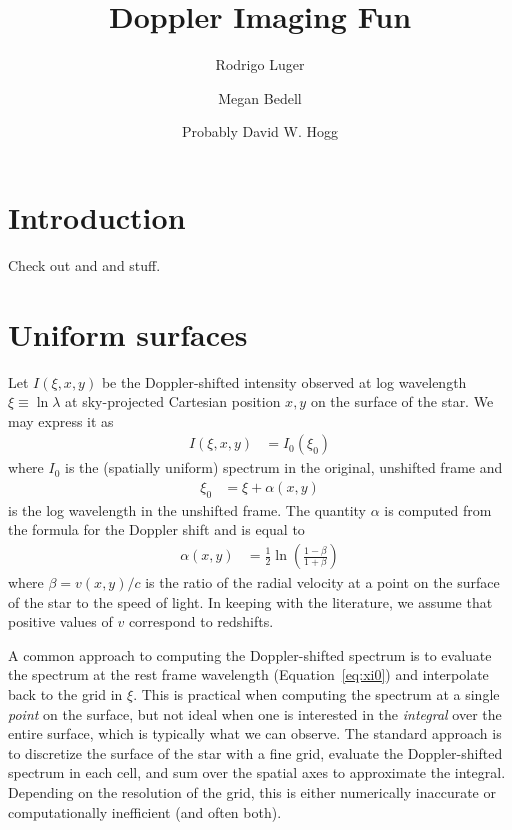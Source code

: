 \documentclass[modern]{aastex62}
\begin{document}
\title{Doppler Imaging Fun}

\author[0000-0002-0296-3826]{Rodrigo Luger}
%
\author{Megan Bedell}
%
\author{Probably David W. Hogg}

%
\section{Introduction}
%
Check out \citet{Luger2019} and \citet{Bedell2019} and stuff.

%
\section{Uniform surfaces}
\label{sec:uniform surfaces}
%
Let $I(\xi, x, y)$ be the Doppler-shifted intensity observed at log wavelength 
$\xi \equiv \ln\lambda$ at sky-projected Cartesian position $x, y$ on the 
surface of the star. We may express it as
%
\begin{align}
    \label{eq:IntensityUnif}
    I(\xi, x, y) &= I_0(\xi_0)
\end{align}
%
where $I_0$ is the (spatially uniform) spectrum in the original, unshifted 
frame and 
%
\begin{align}
    \label{eq:xi0}
    \xi_0 &= \xi + \alpha(x, y)
\end{align}
%
is the log wavelength in the unshifted frame. The quantity $\alpha$ is
computed from the formula for the Doppler shift and is equal to
%
\begin{align}
    \alpha(x, y) 
        &=
        \frac{1}{2}\ln\left( 
            \frac{1 - \beta}{1 + \beta} 
        \right) 
\end{align}
%
where $\beta = v(x, y) / c$ is the ratio of the 
radial velocity at a point on 
the surface of the star to the speed of light. In keeping with the 
literature, we assume that positive values of $v$ correspond to redshifts.

A common approach to computing the Doppler-shifted spectrum is to
evaluate the spectrum at the rest frame wavelength (Equation~\ref{eq:xi0})
and interpolate back to the grid in $\xi$. This is practical when
computing the spectrum at a single \emph{point} on the surface, but not
ideal when one is interested in the \emph{integral} over the entire
surface, which is typically what we can observe. The standard approach is
to discretize the surface of the star with a fine grid, evaluate the
Doppler-shifted spectrum in each cell, and sum over the spatial axes
to approximate the integral. Depending on the resolution of the grid,
this is either numerically inaccurate or computationally inefficient 
(and often both).
\end{document}
